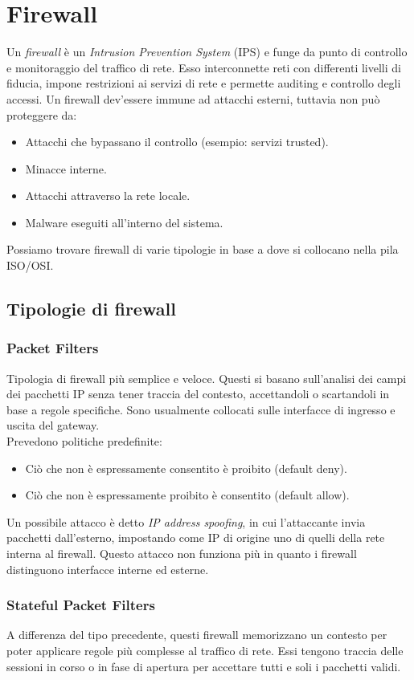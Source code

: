 \documentclass[a4paper, 11pt, notitlepage, fleqn]{report}
\begin{document}
\chapter{Firewall}
Un \emph{firewall} è un \emph{Intrusion Prevention System} (IPS) e funge da punto di controllo e monitoraggio del traffico di rete. Esso interconnette reti con differenti livelli di fiducia, impone restrizioni ai servizi di rete e permette auditing e controllo degli accessi.
Un firewall dev'essere immune ad attacchi esterni, tuttavia non può proteggere da:
\begin{itemize}
	\item Attacchi che bypassano il controllo (esempio: servizi trusted).
	\item Minacce interne.
	\item Attacchi attraverso la rete locale.
	\item Malware eseguiti all'interno del sistema.
\end{itemize}
Possiamo trovare firewall di varie tipologie in base a dove si collocano nella pila ISO/OSI.

\section{Tipologie di firewall}
\subsection{Packet Filters}
Tipologia di firewall più semplice e veloce. Questi si basano sull'analisi dei campi dei pacchetti IP senza tener traccia del contesto, accettandoli o scartandoli in base a regole specifiche.
Sono usualmente collocati sulle interfacce di ingresso e uscita del gateway.\\
Prevedono politiche predefinite:
\begin{itemize}
	\item Ciò che non è espressamente consentito è proibito (default deny).
	\item Ciò che non è espressamente proibito è consentito (default allow).
\end{itemize}
Un possibile attacco è detto \emph{IP address spoofing}, in cui l'attaccante invia pacchetti dall'esterno, impostando come IP di origine uno di quelli della rete interna al firewall. Questo attacco non funziona più in quanto i firewall distinguono interfacce interne ed esterne.

\subsection{Stateful Packet Filters}
A differenza del tipo precedente, questi firewall memorizzano un contesto per poter applicare regole più complesse al traffico di rete. Essi tengono traccia delle sessioni in corso o in fase di apertura per accettare tutti e soli i pacchetti validi.
\end{document}
